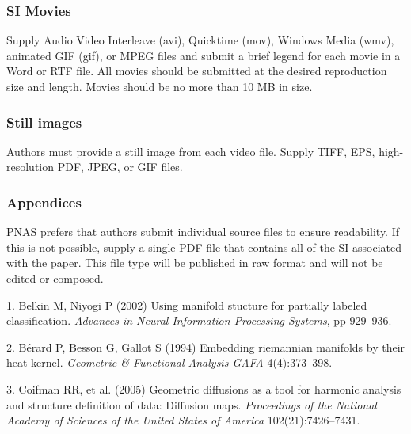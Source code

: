 \documentclass[9pt,twocolumn,twoside,]{pnas-new}
\begin{document}
\subsubsection*{SI Movies}\label{si-movies}

Supply Audio Video Interleave (avi), Quicktime (mov), Windows Media
(wmv), animated GIF (gif), or MPEG files and submit a brief legend for
each movie in a Word or RTF file. All movies should be submitted at the
desired reproduction size and length. Movies should be no more than 10
MB in size.

\subsubsection*{Still images}\label{still-images}

Authors must provide a still image from each video file. Supply TIFF,
EPS, high-resolution PDF, JPEG, or GIF files.

\subsubsection*{Appendices}\label{appendices}

PNAS prefers that authors submit individual source files to ensure
readability. If this is not possible, supply a single PDF file that
contains all of the SI associated with the paper. This file type will be
published in raw format and will not be edited or composed.

\showmatmethods
\showacknow
\pnasbreak

\hypertarget{refs}{}
\hypertarget{ref-belkin2002using}{}
1. Belkin M, Niyogi P (2002) Using manifold stucture for partially
labeled classification. \emph{Advances in Neural Information Processing
Systems}, pp 929--936.

\hypertarget{ref-berard1994embedding}{}
2. Bérard P, Besson G, Gallot S (1994) Embedding riemannian manifolds by
their heat kernel. \emph{Geometric \& Functional Analysis GAFA}
4(4):373--398.

\hypertarget{ref-coifman2005geometric}{}
3. Coifman RR, et al. (2005) Geometric diffusions as a tool for harmonic
analysis and structure definition of data: Diffusion maps.
\emph{Proceedings of the National Academy of Sciences of the United
States of America} 102(21):7426--7431.



% 
\end{document}
